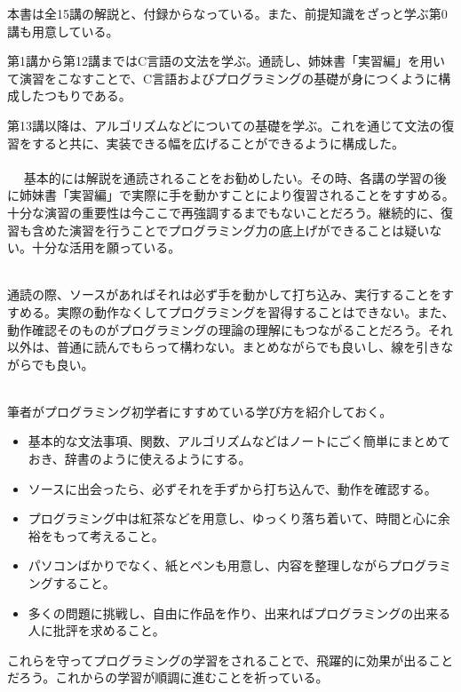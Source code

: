 本書は全15講の解説と、付録からなっている。また、前提知識をざっと学ぶ第0講も用意している。

第1講から第12講まではC言語の文法を学ぶ。通読し、姉妹書「実習編」を用いて演習をこなすことで、C言語およびプログラミングの基礎が身につくように構成したつもりである。

第13講以降は、アルゴリズムなどについての基礎を学ぶ。これを通じて文法の復習をすると共に、実装できる幅を広げることができるように構成した。
\\ \\　
基本的には解説を通読されることをお勧めしたい。その時、各講の学習の後に姉妹書「実習編」で実際に手を動かすことにより復習されることをすすめる。十分な演習の重要性は今ここで再強調するまでもないことだろう。継続的に、復習も含めた演習を行うことでプログラミング力の底上げができることは疑いない。十分な活用を願っている。\\　

通読の際、ソースがあればそれは必ず手を動かして打ち込み、実行することをすすめる。実際の動作なくしてプログラミングを習得することはできない。また、動作確認そのものがプログラミングの理論の理解にもつながることだろう。それ以外は、普通に読んでもらって構わない。まとめながらでも良いし、線を引きながらでも良い。\\　

筆者がプログラミング初学者にすすめている学び方を紹介しておく。
\begin{itemize}
\item 基本的な文法事項、関数、アルゴリズムなどはノートにごく簡単にまとめておき、辞書のように使えるようにする。
\item ソースに出会ったら、必ずそれを手ずから打ち込んで、動作を確認する。
\item プログラミング中は紅茶などを用意し、ゆっくり落ち着いて、時間と心に余裕をもって考えること。
\item パソコンばかりでなく、紙とペンも用意し、内容を整理しながらプログラミングすること。
\item 多くの問題に挑戦し、自由に作品を作り、出来ればプログラミングの出来る人に批評を求めること。
\end{itemize}

これらを守ってプログラミングの学習をされることで、飛躍的に効果が出ることだろう。これからの学習が順調に進むことを祈っている。
